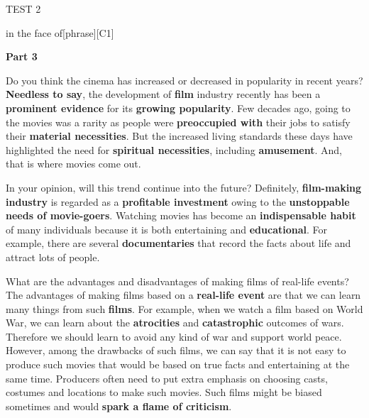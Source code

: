 \documentclass[a4paper,12pt]{article}
\begin{document}
\begin{glossarymc}[Cambridge 3]
\begin{test}{TEST 2}
\begin{VocabExplain}[Part 2]
\begin{ExplainCard}{in the face of}[phrase][C1]
\end{ExplainCard}

\end{VocabExplain}
\noindent
\textbf{Part 3}

\begin{qa}{Do you think the cinema has increased or decreased in popularity in recent years?}
\textbf{Needless to say}, the development of \textbf{film} industry recently has been a \textbf{prominent evidence} for its \textbf{growing popularity}. Few decades ago, going to the movies was a rarity as people were \textbf{preoccupied with} their jobs to satisfy their \textbf{material necessities}. But the increased living standards these days have highlighted the need for \textbf{spiritual necessities}, including \textbf{amusement}. And, that is where movies come out.
\end{qa}

\begin{qa}{In your opinion, will this trend continue into the future?}
Definitely, \textbf{film-making industry} is regarded as a \textbf{profitable investment} owing to the \textbf{unstoppable needs of movie-goers}. Watching movies has become an \textbf{indispensable habit} of many individuals because it is both entertaining and \textbf{educational}. For example, there are several \textbf{documentaries} that record the facts about life and attract lots of people.
\end{qa}

\begin{qa}{What are the advantages and disadvantages of making films of real-life events?}
The advantages of making films based on a \textbf{real-life event} are that we can learn many things from such \textbf{films}. For example, when we watch a film based on World War, we can learn about the \textbf{atrocities} and \textbf{catastrophic} outcomes of wars. Therefore we should learn to avoid any kind of war and support world peace. However, among the drawbacks of such films, we can say that it is not easy to produce such movies that would be based on true facts and entertaining at the same time. Producers often need to put extra emphasis on choosing casts, costumes and locations to make such movies. Such films might be biased sometimes and would \textbf{spark a flame of criticism}.
\end{qa}


\end{test}
\end{glossarymc}
\end{document}
